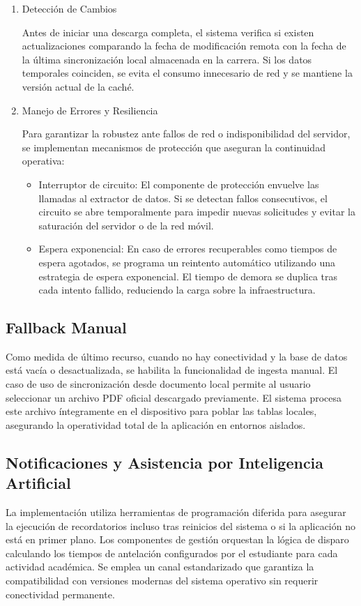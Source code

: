 \begin{enumerate}
    \item Detección de Cambios
    
    Antes de iniciar una descarga completa, el sistema verifica si existen actualizaciones comparando la fecha de modificación remota con la fecha de la última sincronización local almacenada en la carrera. Si los datos temporales coinciden, se evita el consumo innecesario de red y se mantiene la versión actual de la caché.

    \item Manejo de Errores y Resiliencia
    
    Para garantizar la robustez ante fallos de red o indisponibilidad del servidor, se implementan mecanismos de protección que aseguran la continuidad operativa:

    \begin{itemize}
        \item Interruptor de circuito: El componente de protección envuelve las llamadas al extractor de datos. Si se detectan fallos consecutivos, el circuito se abre temporalmente para impedir nuevas solicitudes y evitar la saturación del servidor o de la red móvil.
        \item Espera exponencial: En caso de errores recuperables como tiempos de espera agotados, se programa un reintento automático utilizando una estrategia de espera exponencial. El tiempo de demora se duplica tras cada intento fallido, reduciendo la carga sobre la infraestructura.
    \end{itemize}
\end{enumerate}

\subsection{Fallback Manual}
Como medida de último recurso, cuando no hay conectividad y la base de datos está vacía o desactualizada, se habilita la funcionalidad de ingesta manual. El caso de uso de sincronización desde documento local permite al usuario seleccionar un archivo PDF oficial descargado previamente. El sistema procesa este archivo íntegramente en el dispositivo para poblar las tablas locales, asegurando la operatividad total de la aplicación en entornos aislados.

\subsection{Notificaciones y Asistencia por Inteligencia Artificial}
La implementación utiliza herramientas de programación diferida para asegurar la ejecución de recordatorios incluso tras reinicios del sistema o si la aplicación no está en primer plano. Los componentes de gestión orquestan la lógica de disparo calculando los tiempos de antelación configurados por el estudiante para cada actividad académica. Se emplea un canal estandarizado que garantiza la compatibilidad con versiones modernas del sistema operativo sin requerir conectividad permanente.

